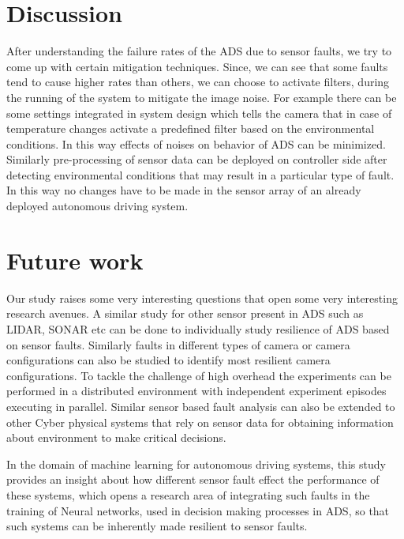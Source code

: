  \section{Discussion}

After understanding the failure rates of the ADS due to sensor faults, we try to come up with certain mitigation techniques. Since, we can see that some faults tend to cause higher rates than others, we can choose to activate filters, during the running of the system to mitigate the image noise. For example there can be some settings integrated in system design which tells the camera that in case of temperature changes activate a predefined filter based on the environmental conditions. In this way effects of noises on behavior of ADS can be minimized. Similarly pre-processing of sensor data can be deployed on controller side after detecting environmental conditions that may result in a particular type of fault. In this way no changes have to be made in the sensor array of an already deployed autonomous driving system.

\section{Future work}
Our study raises some very interesting questions that open some very interesting research avenues. A similar study for other sensor present in ADS such as LIDAR, SONAR etc can be done to individually study resilience of ADS based on sensor faults. Similarly faults in different types of camera or camera configurations can also be studied to identify most resilient camera configurations. To tackle the challenge of high overhead the experiments can be performed in a distributed environment with independent experiment episodes executing in parallel. Similar sensor based fault analysis can also be extended to other Cyber physical systems that rely on sensor data for obtaining information about environment to make critical decisions. 

In the domain of machine learning for autonomous driving systems, this study provides
an insight about how different sensor fault effect the performance of these systems, which opens a research area of integrating such faults in the training of Neural networks, used in decision making processes in ADS, so that such systems can be inherently made resilient to sensor faults.
